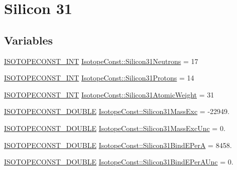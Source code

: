 \hypertarget{group___isotope_const-_silicon-_si31}{}\section{Silicon 31}
\label{group___isotope_const-_silicon-_si31}
\subsection*{Variables}
\begin{DoxyCompactItemize}
\item 
\mbox{\hyperlink{group___isotope_const-_macros_ga5f18360b3e99483a35c32d789e62621c}{I\+S\+O\+T\+O\+P\+E\+C\+O\+N\+S\+T\+\_\+\+I\+NT}} \mbox{\hyperlink{group___isotope_const-_silicon-_si31_ga4586f3711d22cb8bce9b62813b1e9ccc}{Isotope\+Const\+::\+Silicon31\+Neutrons}} = 17
\item 
\mbox{\hyperlink{group___isotope_const-_macros_ga5f18360b3e99483a35c32d789e62621c}{I\+S\+O\+T\+O\+P\+E\+C\+O\+N\+S\+T\+\_\+\+I\+NT}} \mbox{\hyperlink{group___isotope_const-_silicon-_si31_gafedc2a23c861d119bdfa02ac6f7eb315}{Isotope\+Const\+::\+Silicon31\+Protons}} = 14
\item 
\mbox{\hyperlink{group___isotope_const-_macros_ga5f18360b3e99483a35c32d789e62621c}{I\+S\+O\+T\+O\+P\+E\+C\+O\+N\+S\+T\+\_\+\+I\+NT}} \mbox{\hyperlink{group___isotope_const-_silicon-_si31_gaf0cd5484775e6eaf6e11d630e3d2a5df}{Isotope\+Const\+::\+Silicon31\+Atomic\+Weight}} = 31
\item 
\mbox{\hyperlink{group___isotope_const-_macros_ga8f45a7272ce02c0b4c65c44636ed719a}{I\+S\+O\+T\+O\+P\+E\+C\+O\+N\+S\+T\+\_\+\+D\+O\+U\+B\+LE}} \mbox{\hyperlink{group___isotope_const-_silicon-_si31_ga08e8847678350a79cb8b199ccce27b9f}{Isotope\+Const\+::\+Silicon31\+Mass\+Exc}} = -\/22949.
\item 
\mbox{\hyperlink{group___isotope_const-_macros_ga8f45a7272ce02c0b4c65c44636ed719a}{I\+S\+O\+T\+O\+P\+E\+C\+O\+N\+S\+T\+\_\+\+D\+O\+U\+B\+LE}} \mbox{\hyperlink{group___isotope_const-_silicon-_si31_ga97b6bc83bdaf4a21e859ede3fd268972}{Isotope\+Const\+::\+Silicon31\+Mass\+Exc\+Unc}} = 0.
\item 
\mbox{\hyperlink{group___isotope_const-_macros_ga8f45a7272ce02c0b4c65c44636ed719a}{I\+S\+O\+T\+O\+P\+E\+C\+O\+N\+S\+T\+\_\+\+D\+O\+U\+B\+LE}} \mbox{\hyperlink{group___isotope_const-_silicon-_si31_ga372e68f655d92eaa85fa87842f6f6c0a}{Isotope\+Const\+::\+Silicon31\+Bind\+E\+PerA}} = 8458.
\item 
\mbox{\hyperlink{group___isotope_const-_macros_ga8f45a7272ce02c0b4c65c44636ed719a}{I\+S\+O\+T\+O\+P\+E\+C\+O\+N\+S\+T\+\_\+\+D\+O\+U\+B\+LE}} \mbox{\hyperlink{group___isotope_const-_silicon-_si31_gaa9ad1bf65b081b69f3e3efdea0d474f0}{Isotope\+Const\+::\+Silicon31\+Bind\+E\+Per\+A\+Unc}} = 0.

\end{DoxyCompactItemize}
